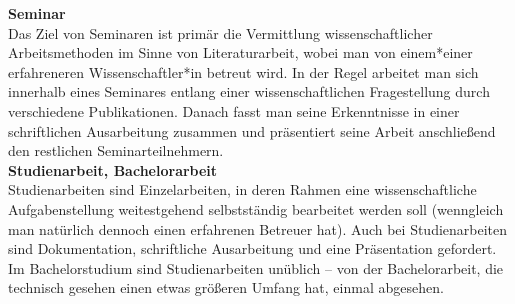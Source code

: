 {    \textbf{Seminar}\\

    Das Ziel von Seminaren ist primär die Vermittlung wissenschaftlicher Arbeitsmethoden im Sinne von Literaturarbeit, wobei man von einem*einer erfahreneren Wissenschaftler*in betreut wird. In der Regel arbeitet man sich innerhalb eines Seminares entlang einer wissenschaftlichen Fragestellung durch verschiedene Publikationen. Danach fasst man seine Erkenntnisse in einer schriftlichen Ausarbeitung zusammen und präsentiert seine Arbeit anschließend den restlichen Seminarteilnehmern.\\

    \textbf{Studienarbeit, Bachelorarbeit}\\

    Studienarbeiten sind Einzelarbeiten, in deren Rahmen eine wissenschaftliche Aufgabenstellung weitestgehend selbstständig bearbeitet werden soll (wenngleich man natürlich dennoch einen erfahrenen Betreuer hat). Auch bei Studienarbeiten sind Dokumentation, schriftliche Ausarbeitung und eine Präsentation gefordert. Im Bachelorstudium sind Studienarbeiten unüblich – von der Bachelorarbeit, die technisch gesehen einen etwas größeren Umfang hat, einmal abgesehen.
}{}
